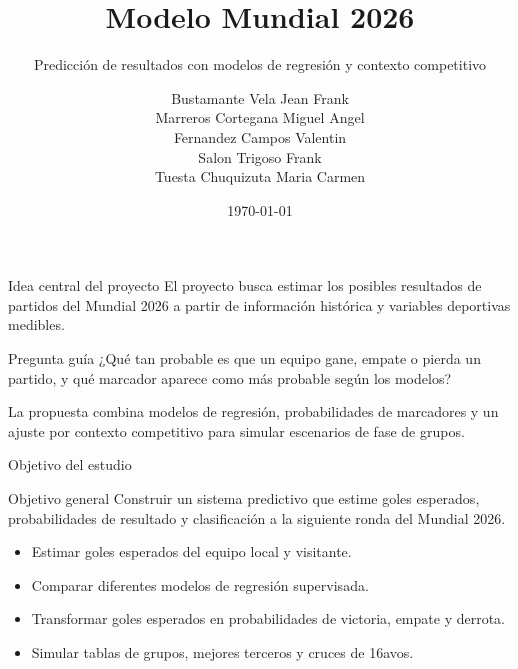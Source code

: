 \documentclass[aspectratio=169]{beamer}
\title[Modelo Mundial 2026]{Modelo Mundial 2026}
\subtitle{Predicción de resultados con modelos de regresión y contexto competitivo}
\author[Equipo de trabajo]{
    Bustamante Vela Jean Frank\\
    Marreros Cortegana Miguel Angel\\
    Fernandez Campos Valentin\\
    Salon Trigoso Frank\\
    Tuesta Chuquizuta Maria Carmen
}
\institute[UNTRM]{
    Universidad Nacional Toribio Rodriguez de Mendoza de Amazonas\\
    Curso: Modelos de Regresión y Aprendizaje Supervisado
}
\date{\today}
\begin{document}
\begin{frame}
    \titlepage
\end{frame}

\begin{frame}{Idea central del proyecto}
\justifying
El proyecto busca estimar los posibles resultados de partidos del Mundial 2026 a partir de información histórica y variables deportivas medibles.

\vspace{0.25cm}
\begin{block}{Pregunta guía}
¿Qué tan probable es que un equipo gane, empate o pierda un partido, y qué marcador aparece como más probable según los modelos?
\end{block}

\vspace{0.2cm}
La propuesta combina modelos de regresión, probabilidades de marcadores y un ajuste por contexto competitivo para simular escenarios de fase de grupos.
\end{frame}

\begin{frame}{Objetivo del estudio}
\begin{block}{Objetivo general}
Construir un sistema predictivo que estime goles esperados, probabilidades de resultado y clasificación a la siguiente ronda del Mundial 2026.
\end{block}

\vspace{0.2cm}
\begin{itemize}
    \item Estimar goles esperados del equipo local y visitante.
    \item Comparar diferentes modelos de regresión supervisada.
    \item Transformar goles esperados en probabilidades de victoria, empate y derrota.
    \item Simular tablas de grupos, mejores terceros y cruces de 16avos.
\end{itemize}
\end{frame}
\end{document}
